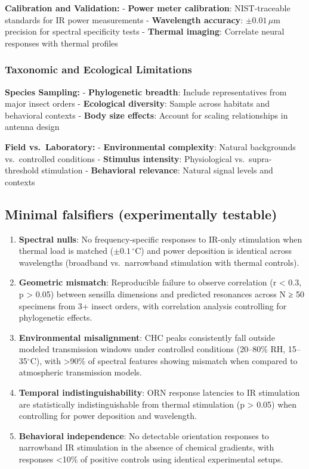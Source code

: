 \documentclass[
  13pt,
  a4paperpaper,
  12pt]{article}
\begin{document}
\textbf{Calibration and Validation:} - \textbf{Power meter calibration}:
NIST-traceable standards for IR power measurements - \textbf{Wavelength
accuracy}: \(\pm 0.01\,\mu\mathrm{m}\) precision for spectral
specificity tests - \textbf{Thermal imaging}: Correlate neural responses
with thermal profiles

\subsubsection{Taxonomic and Ecological
Limitations}\label{taxonomic-and-ecological-limitations}

\textbf{Species Sampling:} - \textbf{Phylogenetic breadth}: Include
representatives from major insect orders - \textbf{Ecological
diversity}: Sample across habitats and behavioral contexts -
\textbf{Body size effects}: Account for scaling relationships in antenna
design

\textbf{Field vs.~Laboratory:} - \textbf{Environmental complexity}:
Natural backgrounds vs.~controlled conditions - \textbf{Stimulus
intensity}: Physiological vs.~supra-threshold stimulation -
\textbf{Behavioral relevance}: Natural signal levels and contexts

\subsection{Minimal falsifiers (experimentally
testable)}\label{minimal-falsifiers-experimentally-testable}

\begin{enumerate}
\def\labelenumi{\arabic{enumi}.}
\item
  \textbf{Spectral nulls}: No frequency-specific responses to IR-only
  stimulation when thermal load is matched
  (\(\pm 0.1\,^{\circ}\mathrm{C}\)) and power deposition is identical
  across wavelengths (broadband vs.~narrowband stimulation with thermal
  controls).
\item
  \textbf{Geometric mismatch}: Reproducible failure to observe
  correlation (r \textless{} 0.3, p \textgreater{} 0.05) between
  sensilla dimensions and predicted resonances across N ≥ 50 specimens
  from 3+ insect orders, with correlation analysis controlling for
  phylogenetic effects.
\item
  \textbf{Environmental misalignment}: CHC peaks consistently fall
  outside modeled transmission windows under controlled conditions
  (20--80\% RH, 15--35\(^{\circ}\mathrm{C}\)), with \textgreater90\% of
  spectral features showing mismatch when compared to atmospheric
  transmission models.
\item
  \textbf{Temporal indistinguishability}: ORN response latencies to IR
  stimulation are statistically indistinguishable from thermal
  stimulation (p \textgreater{} 0.05) when controlling for power
  deposition and wavelength.
\item
  \textbf{Behavioral independence}: No detectable orientation responses
  to narrowband IR stimulation in the absence of chemical gradients,
  with responses \textless10\% of positive controls using identical
  experimental setups.
\end{enumerate}
\end{document}
